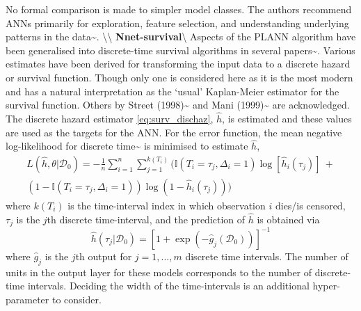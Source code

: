 \documentclass[
  letterpaper,
]{scrbook}
\theoremstyle{plain}
\theoremstyle{definition}
\theoremstyle{remark}
\begin{document}
No formal comparison is made to simpler model classes. The authors
recommend ANNs primarily for exploration, feature selection, and
understanding underlying patterns in the
data\textasciitilde{}\cite{Biganzoli2009}.
\textbackslash\textbackslash{}
\textbf{Nnet-survival}\label{mod:nnetsurvival}\textbackslash{} Aspects
of the PLANN algorithm have been generalised into discrete-time survival
algorithms in several
papers\textasciitilde{}\cite{Gensheimer2019, Kvamme2019, Mani1999, Street1998}.
Various estimates have been derived for transforming the input data to a
discrete hazard or survival function. Though only one is considered here
as it is the most modern and has a natural interpretation as the `usual'
Kaplan-Meier estimator for the survival function. Others by Street
(1998)\textasciitilde{}\cite{Street1998} and Mani
(1999)\textasciitilde{}\cite{Mani1999} are acknowledged. The discrete
hazard estimator \ref{eq:surv_dischaz}, \(\hat{h}\), is estimated and
these values are used as the targets for the ANN. For the error
function, the mean negative log-likelihood for discrete
time\textasciitilde{}\cite{Kvamme2019} is minimised to estimate
\(\hat{h}\), \[
\begin{split}
L(\hat{h}, \theta|\mathcal{D}_0) = -\frac{1}{n} \sum^n_{i=1}\sum^{k(T_i)}_{j=1} (\mathbb{I}(T_i = \tau_j, \Delta_i = 1) \log[\hat{h}_i(\tau_j)] \ + \\
 (1-\mathbb{I}(T_i = \tau_j, \Delta_i = 1))\log(1 - \hat{h}_i(\tau_j)))
\end{split}
\] where \(k(T_i)\) is the time-interval index in which observation
\(i\) dies/is censored, \(\tau_j\) is the \(j\)th discrete
time-interval, and the prediction of \(\hat{h}\) is obtained via \[
\hat{h}(\tau_j|\mathcal{D}_0) = [1 + \exp(-\hat{g}_j(\mathcal{D}_0))]^{-1}
\] where \(\hat{g}_j\) is the \(j\)th output for \(j = 1,...,m\)
discrete time intervals. The number of units in the output layer for
these models corresponds to the number of discrete-time intervals.
Deciding the width of the time-intervals is an additional
hyper-parameter to consider.
\end{document}
